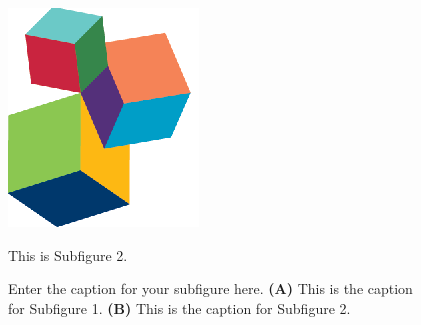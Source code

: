 \documentclass[utf8]{FrontiersinHarvard}
\begin{document}
\begin{subfigure}
        \setcounter{figure}{2}
        \setcounter{subfigure}{1}
        \begin{minipage}[b]{0.5\textwidth}
            \includegraphics[width=\linewidth]{logo2.eps}
            \caption{This is Subfigure 2.}
            \label{fig:Subfigure 2}
        \end{minipage}

        \setcounter{figure}{2}
        \setcounter{subfigure}{-1}
        \caption{Enter the caption for your subfigure here. \textbf{(A)} This is the caption for Subfigure 1. \textbf{(B)} This is the caption for Subfigure 2.}
        \label{fig: subfigures}
    \end{subfigure}

\end{document}
